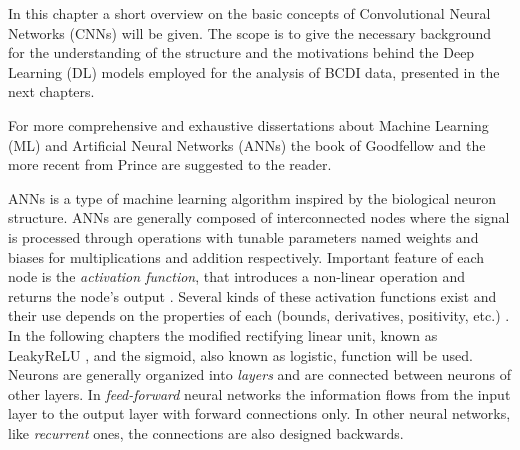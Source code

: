 

In this chapter a short overview on the basic concepts of Convolutional Neural Networks (CNNs) will be given. 
The scope is to give the necessary background for the understanding of the structure and the motivations behind the 
Deep Learning (DL) models employed for the analysis of BCDI data, presented in the next chapters.  

For more comprehensive and exhaustive dissertations about Machine Learning (ML) and Artificial Neural Networks (ANNs)
the book of Goodfellow \cite{Goodfellow_2016} and the more recent from Prince \cite{prince2023understanding} are 
suggested to the reader. 

ANNs is a type of machine learning algorithm inspired by the biological neuron structure. ANNs are generally composed of interconnected 
nodes where the signal is processed through operations with tunable parameters named weights 
and biases for multiplications and addition respectively. Important feature of each node is the \textit{activation function}, 
that introduces a non-linear operation and returns the node's output \cite{jagtap2022}. Several kinds of these 
activation functions exist and their use depends on the properties of each (bounds, derivatives, positivity, etc.) 
\cite{kunc2024}. In the following chapters the modified rectifying linear unit, known as LeakyReLU \cite{Maas2013RectifierNI}, 
and the sigmoid, also known as logistic, function will be used. Neurons are generally organized into \textit{layers} and 
are connected between neurons of other layers. In \textit{feed-forward} neural networks the information flows from the 
input layer to the output layer with forward connections only.
In other neural networks, like \textit{recurrent} ones, the connections are also designed backwards. 

